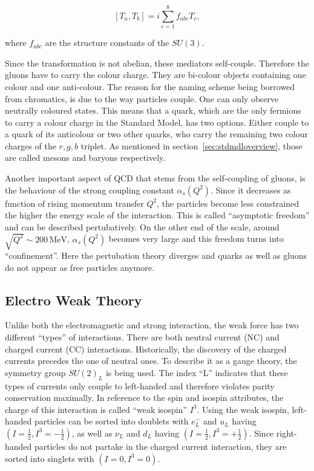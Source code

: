 \begin{equation}
  \label{eq:qcdgencommute}
  \left[ T_a, T_b \right] = i \sum_{c=1}^8 f_{abc} T_c,
\end{equation}

\noindent where $f_{abc}$ are the structure constants of the $SU(3)$. 

Since the transformation is not abelian, these mediators self-couple. Therefore the gluons have to carry the colour charge. They are bi-colour objects containing one colour and one anti-colour. The reason for the naming scheme being borrowed from chromatics, is due to the way particles couple. One can only observe neutrally coloured states. This means that a quark, which are the only fermions to carry a colour charge in the Standard Model, has two options. Either couple to a quark of its anticolour or two other quarks, who carry the remaining two colour charges of the $r,g,b$ triplet. As mentioned in section~\ref{sec:stdmdloverview}, those are called mesons and baryons respectively.

Another important aspect of QCD that stems from the self-coupling of gluons, is the behaviour of the strong coupling constant $\alpha_s(Q^2)$. Since it decreases as function of rising momentum transfer $Q^2$, the particles become less constrained the higher the energy scale of the interaction. This is called ``asymptotic freedom'' and can be described pertubatively. On the other end of the scale, around $\sqrt{Q^2} \sim 200\,\text{MeV}$, $\alpha_s(Q^2)$ becomes very large and this freedom turns into ``confinement''. Here the pertubation theory diverges and quarks as well as gluons do not appear as free particles anymore.

\subsection{Electro Weak Theory}

Unlike both the electromagnetic and strong interaction, the weak force has two different ``types'' of interactions. There are both neutral current (NC) and charged current (CC) interactions. Historically, the discovery of the charged currents precedes the one of neutral ones. To describe it as a gauge theory, the symmetry group $SU(2)_L$ is being used. The index ``L'' indicates that these types of currents only couple to left-handed and therefore violates parity conservation maximally. In reference to the spin and isospin attributes, the charge of this interaction is called ``weak isospin'' $I^3$. Using the weak isospin, left-handed particles can be sorted into doublets with $e^-_L$ and $u_L$ having $(I = \frac{1}{2}, I^3 = -\frac{1}{2})$, as well as $\nu_L$ and $d_L$ having $(I = \frac{1}{2}, I^3 = +\frac{1}{2})$. Since right-handed particles do not partake in the charged current interaction, they are sorted into singlets with $(I = 0, I^3 = 0)$.

